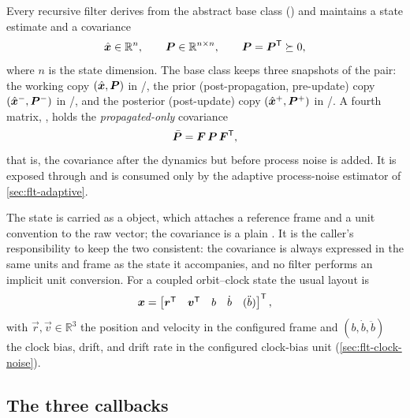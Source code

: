 Every recursive filter derives from the abstract base class 
() and maintains a state estimate and
a covariance
\begin{equation}
  \label{eq:flt-state}
  \hat{\bm{x}} \in \mathbb{R}^{n},
  \qquad
  \bm{P} \in \mathbb{R}^{n\times n},
  \qquad
  \bm{P} = \bm{P}^{\mathsf{T}} \succeq 0 ,
\end{equation}
where $n$ is the state dimension. The base class keeps three snapshots of the
pair: the working copy $(\hat{\bm{x}}, \bm{P})$ in /, the
prior (post-propagation, pre-update) copy
$(\hat{\bm{x}}^{-}, \bm{P}^{-})$ in /, and
the posterior (post-update) copy $(\hat{\bm{x}}^{+}, \bm{P}^{+})$ in
/. A fourth matrix, , holds the
\emph{propagated-only} covariance
\begin{equation}
  \label{eq:flt-pbar}
  \bar{\bm{P}} = \bm{F}\,\bm{P}\,\bm{F}^{\mathsf{T}} ,
\end{equation}
that is, the covariance after the dynamics but before process noise is added.
It is exposed through  and is consumed only by the
adaptive process-noise estimator of \cref{sec:flt-adaptive}.

The state is carried as a  object, which attaches a reference frame
and a unit convention to the raw vector; the covariance is a plain
. It is the caller's responsibility to keep the two consistent: the
covariance is always expressed in the same units and frame as the state it
accompanies, and no filter performs an implicit unit conversion. For a coupled
orbit--clock state the usual layout is
\begin{equation}
  \label{eq:flt-layout}
  \bm{x} =
  \begin{bmatrix}
    \bm{r}^{\mathsf{T}} & \bm{v}^{\mathsf{T}} & b & \dot{b} & (\ddot{b})
  \end{bmatrix}^{\mathsf{T}} ,
\end{equation}
with $\vec{r}, \vec{v} \in \mathbb{R}^3$ the position and velocity in the
configured frame and $(b, \dot{b}, \ddot{b})$ the clock bias, drift, and
drift rate in the configured clock-bias unit
(\cref{sec:flt-clock-noise}).

\subsection{The three callbacks}

